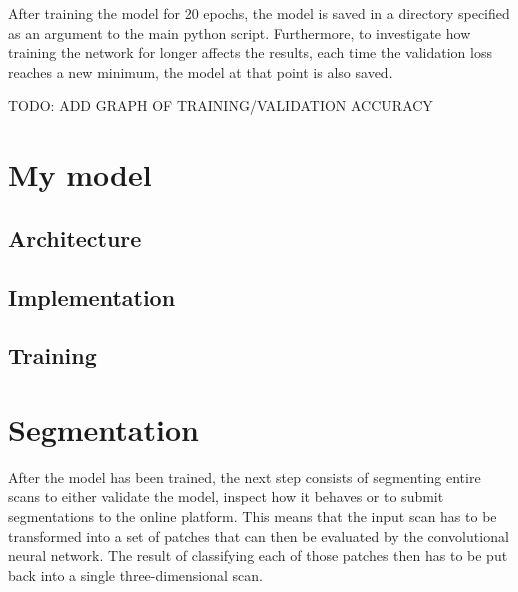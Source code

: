 \documentclass[12pt,a4paper,twoside,openright]{report}
\begin{document}
After training the model for 20 epochs, the model is saved in a directory specified as an argument to the main python script. Furthermore, to investigate how training the network for longer affects the results, each time the validation loss reaches a new minimum, the model at that point is also saved.

TODO: ADD GRAPH OF TRAINING/VALIDATION ACCURACY
\section{My model}
\subsection{Architecture}
\subsection{Implementation}
\subsection{Training}

\section{Segmentation}
After the model has been trained, the next step consists of segmenting entire scans to either validate the model, inspect how it behaves or to submit segmentations to the online platform. This means that the input scan has to be transformed into a set of patches that can then be evaluated by the convolutional neural network. The result of classifying each of those patches then has to be put back into a single three-dimensional scan.
\end{document}
